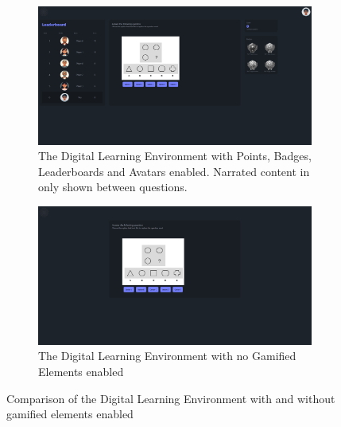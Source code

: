 \begin{figure}[H]
  \centering
  \begin{subfigure}[t]{0.4\textwidth}
    \includegraphics[width=\textwidth]{img/question_screen.png}
    \caption{The Digital Learning Environment with Points, Badges, Leaderboards and Avatars enabled. Narrated content in only shown between questions.}
    \label{fig:figureScreenEnabled}
  \end{subfigure}
  \hspace{5mm}
  \begin{subfigure}[t]{0.4\textwidth}
    \includegraphics[width=\textwidth]{img/question_screen_no_elements.png}
    \caption{The Digital Learning Environment with no Gamified Elements enabled}
    \label{fig:figureScreenDisabled}
  \end{subfigure}
  \caption{Comparison of the Digital Learning Environment with and without gamified elements enabled}
\end{figure}

